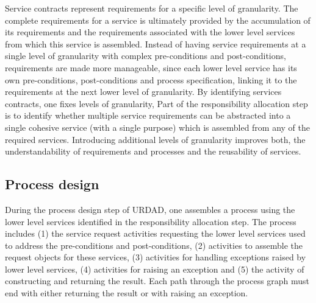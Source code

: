 Service contracts represent requirements for a specific level of granularity. The complete requirements for a service is ultimately provided by the accumulation of its requirements and the requirements associated with the lower level services from which this service is assembled. Instead of having service requirements at a single level of granularity with complex pre-conditions and post-conditions, requirements are made more manageable, since each lower level service has its own pre-conditions, post-conditions and process specification, linking it to the requirements at the next lower level of granularity. By identifying services contracts, one fixes levels of granularity, Part of the responsibility allocation step is to identify whether multiple service requirements can be abstracted into a single cohesive service (with a single purpose) which is assembled from any of the required services. Introducing additional levels of granularity improves both, the understandability of requirements and processes and the reusability of services.


\subsection{Process design}

During the process design step of URDAD, one assembles a process using the lower level services identified in the responsibility allocation step. The process includes (1) the service request activities requesting the lower level services used to address the pre-conditions and post-conditions, (2) activities to assemble the request objects for these services, (3) activities for handling exceptions raised by lower level services, (4) activities for raising an exception and (5) the activity of constructing and returning the result. Each path through the process graph must end with either returning the result or with raising an exception.